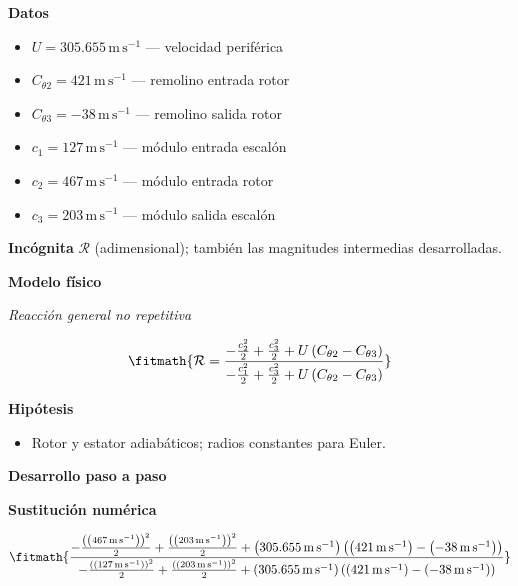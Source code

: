 \documentclass[10pt,openany]{book}
\begin{document}
\noindent\textbf{Datos}
\begin{itemize}
\item $U = 305.655\,\mathrm{m}\,\mathrm{s}^{-1}$ — velocidad periférica
\item $C_{\theta 2} = 421\,\mathrm{m}\,\mathrm{s}^{-1}$ — remolino entrada rotor
\item $C_{\theta 3} = -38\,\mathrm{m}\,\mathrm{s}^{-1}$ — remolino salida rotor
\item $c_{1} = 127\,\mathrm{m}\,\mathrm{s}^{-1}$ — módulo entrada escalón
\item $c_{2} = 467\,\mathrm{m}\,\mathrm{s}^{-1}$ — módulo entrada rotor
\item $c_{3} = 203\,\mathrm{m}\,\mathrm{s}^{-1}$ — módulo salida escalón
\end{itemize}

\noindent\textbf{Incógnita}
$\mathcal{R}$ (adimensional); también las magnitudes intermedias desarrolladas.

\noindent\textbf{Modelo físico}

\noindent\textit{Reacción general no repetitiva}

\[
\fitmath{\mathcal R=\frac{- \frac{c_{2}^{2}}{2} + \frac{c_{3}^{2}}{2} + U \left(C_{\theta 2} - C_{\theta 3}\right)}{- \frac{c_{1}^{2}}{2} + \frac{c_{3}^{2}}{2} + U \left(C_{\theta 2} - C_{\theta 3}\right)}}
\]

\noindent\textbf{Hipótesis}
\begin{itemize}
\item Rotor y estator adiabáticos; radios constantes para Euler.
\end{itemize}

\noindent\textbf{Desarrollo paso a paso}



\noindent\textbf{Sustitución numérica}

\[
\fitmath{\frac{- \frac{\left(\left(467\,\mathrm{m}\,\mathrm{s}^{-1}\right)\right)^{2}}{2} + \frac{\left(\left(203\,\mathrm{m}\,\mathrm{s}^{-1}\right)\right)^{2}}{2} + \left(305.655\,\mathrm{m}\,\mathrm{s}^{-1}\right) \left(\left(421\,\mathrm{m}\,\mathrm{s}^{-1}\right) - \left(-38\,\mathrm{m}\,\mathrm{s}^{-1}\right)\right)}{- \frac{\left(\left(127\,\mathrm{m}\,\mathrm{s}^{-1}\right)\right)^{2}}{2} + \frac{\left(\left(203\,\mathrm{m}\,\mathrm{s}^{-1}\right)\right)^{2}}{2} + \left(305.655\,\mathrm{m}\,\mathrm{s}^{-1}\right) \left(\left(421\,\mathrm{m}\,\mathrm{s}^{-1}\right) - \left(-38\,\mathrm{m}\,\mathrm{s}^{-1}\right)\right)}}
\]
\end{document}
